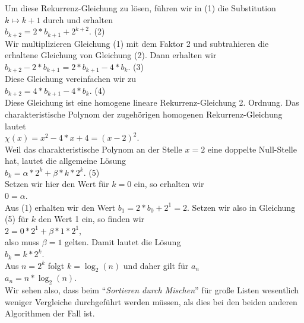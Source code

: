 Um diese Rekurrenz-Gleichung zu l\"osen, f\"uhren wir in (1) die Substitution $k \mapsto k+1$ durch und erhalten \\[0.1cm]
\hspace*{1.3cm}  $b_{k+2} = 2 * b_{k+1} + 2^{k+2}$. \hspace*{\fill} (2) \\[0.1cm]
Wir multiplizieren Gleichung (1) mit dem Faktor 2 und subtrahieren die erhaltene Gleichung von Gleichung (2). 
Dann erhalten wir \\[0.1cm]
\hspace*{1.3cm}  $b_{k+2} - 2 * b_{k+1} = 2 * b_{k+1} - 4 * b_k$. \hspace*{\fill} (3) \\[0.1cm]
Diese Gleichung vereinfachen wir zu \\[0.1cm]
\hspace*{1.3cm}  $b_{k+2} = 4 * b_{k+1} - 4 * b_k$. \hspace*{\fill} (4) \\[0.1cm]
Diese Gleichung ist eine homogene lineare Rekurrenz-Gleichung 2. Ordnung.
Das charakteristische Polynom der zugeh\"origen homogenen Rekurrenz-Gleichung lautet \\[0.1cm]
\hspace*{1.3cm} $\displaystyle \chi(x) = x^2 - 4 *x + 4 = (x-2)^2$. \\[0.1cm]
Weil das charakteristische Polynom an der Stelle $x=2$ eine doppelte Null-Stelle hat, 
lautet die allgemeine L\"osung \\[0.1cm]
\hspace*{1.3cm} $\displaystyle b_k = \alpha * 2^k + \beta * k * 2^k$. \hspace*{\fill} (5) \\[0.1cm]
Setzen wir hier den Wert f\"ur $k=0$ ein, so erhalten wir \\[0.1cm]
\hspace*{1.3cm} $0 = \alpha$. \\[0.1cm]
Aus (1) erhalten wir den Wert $b_1 = 2 * b_0 + 2^1 = 2$.  Setzen wir also in Gleichung (5) f\"ur $k$ den Wert 1 ein, 
so finden wir \\[0.1cm]
\hspace*{1.3cm} $2 = 0 * 2^1 + \beta * 1 * 2^1$,  \\[0.1cm]
also muss $\beta = 1$ gelten.  Damit lautet die L\"osung \\[0.1cm]
\hspace*{1.3cm} $b_k = k * 2^k$. \\[0.1cm]
Aus $n = 2^k$ folgt $k = \log_2(n)$ und daher gilt f\"ur $a_n$ \\[0.1cm]
\hspace*{1.3cm} $a_n = n * \log_2(n)$. \\[0.1cm]
Wir sehen also, dass beim ``\emph{Sortieren durch Mischen}'' f\"ur gro\ss{}e Listen wesentlich weniger Vergleiche
durchgef\"uhrt werden m\"ussen, als dies bei den beiden anderen Algorithmen der Fall ist.

